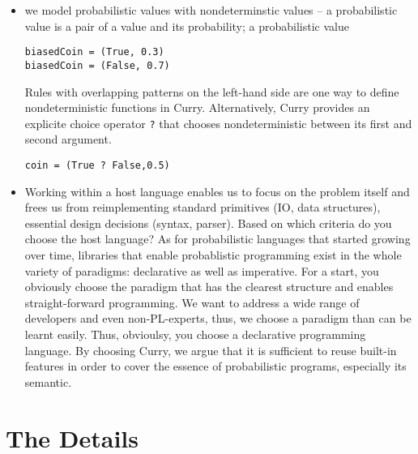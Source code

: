 \documentclass[
12pt, %
a4paper, %
oneside, %
]{llncs}
\newcommand{\code}[1]{{\texttt{#1}}}
\begin{document}
\begin{itemize}
\item we model probabilistic values with nondeterminstic values -- a
  probabilistic value is a pair of a value and its probability; a
  probabilistic value %

\begin{verbatim}
biasedCoin = (True, 0.3)
biasedCoin = (False, 0.7)
\end{verbatim}

  Rules with overlapping patterns on the left-hand side are one way to
  define nondeterministic functions in Curry. %
  Alternatively, Curry provides an explicite choice operator \code{?}
  that chooses nondeterministic between its first and second
  argument. %

\begin{verbatim}
coin = (True ? False,0.5)
\end{verbatim}

\item Working within a host language enables us to focus on the
  problem itself and frees us from reimplementing standard primitives
  (IO, data structures), essential design decisions (syntax,
  parser). %
  Based on which criteria do you choose the host language? %
  As for probabilistic languages that started growing over time,
  libraries that enable probablistic programming exist in the whole
  variety of paradigms: declarative as well as imperative. %
  For a start, you obviously choose the paradigm that has the clearest
  structure and enables straight-forward programming. %
  We want to address a wide range of developers and even
  non-PL-experts, thus, we choose a paradigm than can be learnt
  easily. %
  Thus, obvioulsy, you choose a declarative programming language. %
  By choosing Curry, we argue that it is sufficient to reuse built-in
  features in order to cover the essence of probabilistic programs,
  especially its semantic. %
  
\end{itemize}

\section{The Details}
\end{document}
